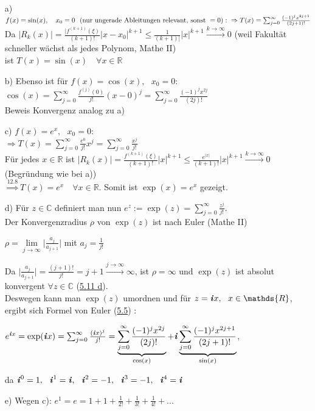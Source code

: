 \documentclass[a4paper, 12pt,titlepage, pdf, headsepline]{article}
\newcommand{\R}{\mathds{R}}
\newcommand{\C}{\mathds{C}}
\renewcommand{\i}{\textbf{\textit{i}}}
\renewcommand{\>}{\rightarrow}
\renewcommand{\*}{\cdot}
\begin{document}
\begin{itemize}
	\item[a)] $f(x) = \sin(x),~~~ x_0 = 0~\text{ (nur ungerade Ableitungen relevant, sonst }=0):\\
	\Rightarrow T(x) = \sum_{j = 0}^{\infty} \frac{(-1)^j x^{2j+1}}{(2j+1)!}$\\
	Da $|R_k(x)| = \frac{|f^{(k+1)} (\xi)}{(k+1)!}|x-x_0|^{k+1} \leq \frac{1}{(k+1)|} |x|^{k+1} \overset{k \rightarrow \infty}{\rightarrow} 0$ (weil Fakultät schneller wächst als jedes Polynom, Mathe II)\\
	ist $T(x) = \sin(x) \quad \forall x \in \R$
	\item[b)] Ebenso ist für $f(x) = \cos(x),~~~ x_0 = 0$:\\
	$\cos(x) =  \sum_{j = 0}^{\infty} \frac{f^{(j)}(0)}{j!} (x-0)^j = \sum_{j = 0}^{\infty} \frac{(-1)^j x^{2j}}{(2j)!}$ \\
	Beweis Konvergenz analog zu a)
	\item[c)] $f(x) = e^x,~~~ x_0 = 0$:\\
	$\Rightarrow T(x) = \sum_{j = 0}^{\infty} \frac{e^0}{j!}x^j = \sum_{j  = 0}^{\infty} \frac{x^j}{j!}$\\
	Für jedes $x \in \R$ ist $|R_k(x)| = \frac{f^{(k+1)}(\xi)}{(k+1)!}|x|^{k+1} \leq \frac{e^{|x|}}{(k+1)!}|x|^{k+1} \overset{k \rightarrow \infty}{\rightarrow} 0$ (Begründung wie bei a))\\
	$\overset{\hyperref[12.8]{12.8}}{\Rightarrow} T(x) = e^x \quad \forall x \in \R$. Somit ist $\exp(x) = e^x$ gezeigt.
	\item[d)] Für $z \in \C$ definiert man nun $e^z := \exp(z) = \sum_{j = 0}^{\infty} \frac{z^j}{j!}$.\\
	Der Konvergenzradius $\rho$ von $\exp(z)$ ist nach Euler (Mathe II)
	\begin{center}
		$\rho = \lim\limits_{j\rightarrow \infty}\Big| \frac{a_j}{a_{j+1}}\Big|$ mit $a_j = \frac{1}{j!}$
	\end{center}
	Da $\Big| \frac{a_j}{a_{j+1}}\Big| = \frac{(j+1)!}{j!} = j+1 \overset{j \rightarrow \infty}{\rightarrow}\infty$, ist $\rho = \infty$ und $\exp(z)$ ist absolut konvergent $\forall z \in \C$ (\hyperref[5.11]{5.11 d}).\\
	Deswegen kann man $\exp(z)$ umordnen und für $z = \i x,~~ x \in \R$, ergibt sich Formel von Euler (\hyperref[5.5]{5.5}) :
	\begin{center}
		$e^{\i x} = \exp(\i x) = \sum_{j = 0}^{\infty} \frac{(\i x)^j}{j!} = \underbrace{\sum_{j = 0}^{\infty} \frac{(-1)^j x^{2j}}{(2j)!}}_{\cos(x)}  + \i\underbrace{\sum_{j = 0}^{\infty} \frac{(-1)^j x^{2j+1}}{(2j+1)!}}_{\sin(x)}$,
	\end{center}
	da $\i^0 = 1,~~ \i^1 = \i,~~ \i^2 = -1,~~ \i^3 = -1,~~\i^4=\i$
	\item[e)] Wegen c): $e^1 = e = 1+1+\frac{1}{2!} + \frac{1}{3!} + \frac{1}{4!} + ...$                                                   
\end{itemize}
\end{document}
